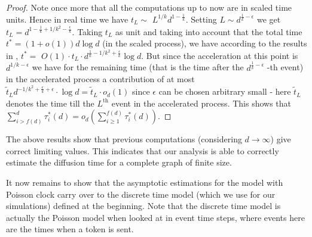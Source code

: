 \begin{proof}
Note once more that all the computations up to now are in scaled time units.
Hence in real time we have $t_{L}\sim $ $L^{1/k}d^{1-\frac{1}{k}}.$ Setting $%
L\sim d^{\frac{1}{k}-\epsilon }$ we get $t_{L}=d^{1-\frac{1}{k}+1/k^{2}-%
\frac{\epsilon }{k}}.$ Taking $t_{L}$ as unit and taking into account that
the total time  $t^{\ast
}=\left( 1+o\left( 1\right) \right) d\log d$ (in the scaled process), we have according to the
results in \cite{kaplan1977generalization}, $t^{\ast }=$ $O\left(
1\right) \cdot t_{L}\cdot d^{\frac{1}{k}-1/k^{2}+\frac{\epsilon }{k}}\log d.$
But since the acceleration at this point is $d^{1/k-\epsilon }$ we have for
the remaining time (that is the time after the $d^{\frac{1}{k}-\epsilon }$%
-th event) in the accelerated process a contribution of at most $\tilde{t}%
_{L}d^{-1/k^{2}+\frac{\epsilon }{k}+\epsilon }\cdot \log d=\tilde{t}%
_{L}\cdot o_{d}\left( 1\right) $ since $\epsilon $ can be chosen arbitrary
small - here $\tilde{t}_{L}$ denotes the time till the $L^\textrm{th}$ event in the
accelerated process. This shows that $\sum_{i>f\left( d\right) }^{d}\tau
_{i}^{\ast }\left( d\right) =o_{d}\left( \sum_{i\geq 1}^{f\left( d\right)
}\tau _{i}^{\ast }\left( d\right) \right) .$

\end{proof}

{The above results show that previous computations (considering $d\rightarrow \infty$) give correct limiting values. 
This indicates that our analysis is able to correctly estimate the diffusion time for a complete graph of finite size.}


It now remains to show that the asymptotic estimations for the model with
Poisson clock carry over to the discrete time model (which we use for our simulations) defined at the
beginning. Note that the discrete time model is actually the Poisson
model when looked at in event time steps, where events here are the
times when a token is sent. 


